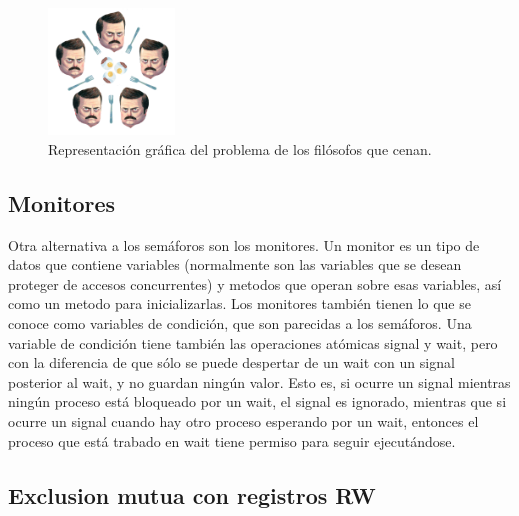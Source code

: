 \documentclass{article}
\begin{document}
\begin{figure}[H]
    \centering
    \includegraphics[width=0.3\textwidth]{imgs/at_the_table.png}
    \caption{Representación gráfica del problema de los filósofos que cenan.}
    \label{fig:philosophers}
\end{figure}


\subsection{Monitores}

Otra alternativa a los sem\'aforos son los monitores. Un monitor es un tipo de datos que contiene variables (normalmente son las variables que se desean proteger de accesos concurrentes) y metodos que operan sobre esas variables, as\'i como un metodo para inicializarlas. Los monitores tambi\'en tienen lo que se conoce como variables de condici\'on, que son parecidas a los sem\'aforos. Una variable de condici\'on tiene tambi\'en las operaciones at\'omicas signal y wait, pero con la diferencia de que s\'olo se puede despertar de un wait con un signal posterior al wait, y no guardan ning\'un valor. Esto es, si ocurre un signal mientras ning\'un proceso est\'a bloqueado por un wait, el signal es ignorado, mientras que si ocurre un signal cuando hay otro proceso esperando por un wait, entonces el proceso que est\'a trabado en wait tiene permiso para seguir ejecut\'andose.

\subsection{Exclusion mutua con registros RW}
\end{document}
